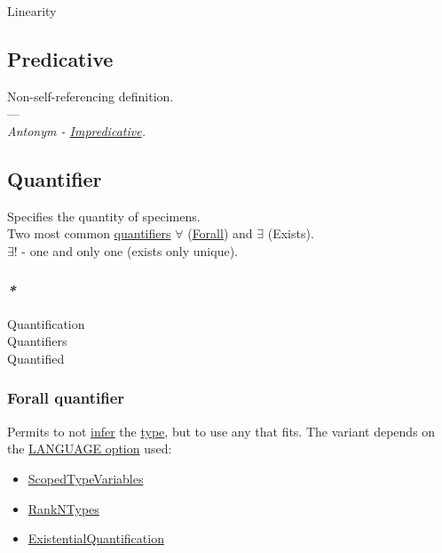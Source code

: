 \documentclass[a4paper,14pt,oneside]{book}
\begin{document}
\label{orgad5e773}Linearity\\

\subsection{\label{org7f269c8}Predicative}
\label{sec:org489ed7e}
Non-self-referencing definition.\\

---\\

\emph{Antonym - \hyperref[orgdebf6f8]{Impredicative}.}\\

\subsection{\label{org64f8d45}Quantifier}
\label{sec:org06caf76}
Specifies the quantity of specimens.\\

Two most common \hyperref[orgd22b6bc]{quantifiers} \(\forall\) (\hyperref[org1bebc13]{Forall}) and \(\exists\) (Exists).\\
\(\exists !\) - one and only one (exists only unique).\\

\subsubsection{\emph{*}}
\label{sec:orgc6c5ba6}

\label{org5865b07}Quantification\\
\label{orgd22b6bc}Quantifiers\\
\label{orgf7fbf65}Quantified\\

\subsubsection{\label{org2962952}Forall quantifier}
\label{sec:org13f95a9}
Permits to not \hyperref[org52c7d69]{infer} the \hyperref[org33d7e2e]{type}, but to use any that fits. The variant depends on the \hyperref[orge1258cb]{LANGUAGE option} used:\\
\begin{itemize}
\item \hyperref[org7d1d21e]{ScopedTypeVariables}\\
\item \hyperref[org6e77ba0]{RankNTypes}\\
\item \hyperref[orgb996d87]{ExistentialQuantification}\\
\end{itemize}
\end{document}
